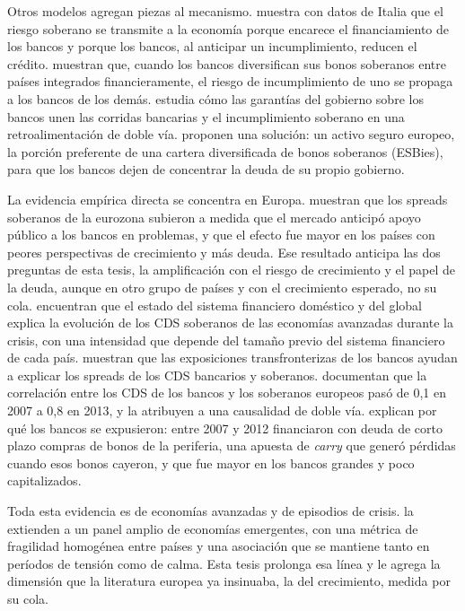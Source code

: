 Otros modelos agregan piezas al mecanismo. \citet{Bocola2016} muestra con datos de Italia que el riesgo soberano se transmite a la economía porque encarece el financiamiento de los bancos y porque los bancos, al anticipar un incumplimiento, reducen el crédito. \citet{BoltonJeanne2011} muestran que, cuando los bancos diversifican sus bonos soberanos entre países integrados financieramente, el riesgo de incumplimiento de uno se propaga a los bancos de los demás. \citet{Leonello2018} estudia cómo las garantías del gobierno sobre los bancos unen las corridas bancarias y el incumplimiento soberano en una retroalimentación de doble vía. \citet{BrunnermeierEtAl2016} proponen una solución: un activo seguro europeo, la porción preferente de una cartera diversificada de bonos soberanos (ESBies), para que los bancos dejen de concentrar la deuda de su propio gobierno.

La evidencia empírica directa se concentra en Europa. \citet{ModySandri2012} muestran que los spreads soberanos de la eurozona subieron a medida que el mercado anticipó apoyo público a los bancos en problemas, y que el efecto fue mayor en los países con peores perspectivas de crecimiento y más deuda. Ese resultado anticipa las dos preguntas de esta tesis, la amplificación con el riesgo de crecimiento y el papel de la deuda, aunque en otro grupo de países y con el crecimiento esperado, no su cola. \citet{DieckmannPlank2012} encuentran que el estado del sistema financiero doméstico y del global explica la evolución de los CDS soberanos de las economías avanzadas durante la crisis, con una intensidad que depende del tamaño previo del sistema financiero de cada país. \citet{KallestrupLandoMurgoci2016} muestran que las exposiciones transfronterizas de los bancos ayudan a explicar los spreads de los CDS bancarios y soberanos. \citet{FratzscherRieth2019} documentan que la correlación entre los CDS de los bancos y los soberanos europeos pasó de 0,1 en 2007 a 0,8 en 2013, y la atribuyen a una causalidad de doble vía. \citet{AcharyaSteffen2015} explican por qué los bancos se expusieron: entre 2007 y 2012 financiaron con deuda de corto plazo compras de bonos de la periferia, una apuesta de \textit{carry} que generó pérdidas cuando esos bonos cayeron, y que fue mayor en los bancos grandes y poco capitalizados.

Toda esta evidencia es de economías avanzadas y de episodios de crisis. \citet{Chari2024b} la extienden a un panel amplio de economías emergentes, con una métrica de fragilidad homogénea entre países y una asociación que se mantiene tanto en períodos de tensión como de calma. Esta tesis prolonga esa línea y le agrega la dimensión que la literatura europea ya insinuaba, la del crecimiento, medida por su cola.

